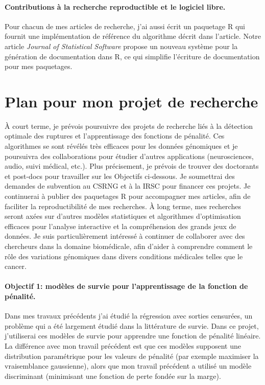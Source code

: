 \documentclass{article}
\begin{document}
\paragraph{Contributions à la recherche reproductible et le logiciel
  libre.} Pour chacun de mes articles de recherche, j'ai aussi écrit
un paquetage R qui fournit une implémentation de référence du
algorithme décrit dans l'article. Notre article \emph{Journal of
  Statistical Software} \citep{hocking13:inlinedocs} propose un
nouveau système pour la génération de documentation dans R, ce qui
simplifie l'écriture de documentation pour mes paquetages.

\section{Plan pour mon projet de recherche}

À court terme, je prévois poursuivre des projets de recherche liés à
la détection optimale des ruptures et l'apprentissage des fonctions de
pénalité. Ces algorithmes se sont révélés très efficaces pour les
données génomiques et je poursuivra des collaborations pour étudier
d'autres applications (neurosciences, audio, suivi médical,
etc.). Plus précisement, je prévois de trouver des doctorants et
post-docs pour travailler sur les Objectifs ci-dessous. Je soumettrai
des demandes de subvention au CSRNG et à la IRSC pour financer ces
projets. Je continuerai à publier des paquetages R pour accompagner
mes articles, afin de faciliter la reproductibilité de mes
recherches. À long terme, mes recherches seront axées sur d'autres
modèles statistiques et algorithmes d'optimisation efficaces pour
l'analyse interactive et la compréhension des grands jeux de
données. Je suis particulièrement intéressé à continuer de collaborer
avec des chercheurs dans la domaine biomédicale, afin d'aider à
comprendre comment le rôle des variations génomiques dans divers
conditions médicales telles que le cancer.

\paragraph{Objectif 1: modèles de survie pour l'apprentissage de la
  fonction de pénalité.} Dans mes travaux précédents j'ai étudié la
régression avec sorties censurées, un problème qui a été largement
étudié dans la littérature de survie. Dans ce projet, j'utiliserai ces
modèles de survie pour apprendre une fonction de pénalité linéaire. La
différence avec mon travail précédent est que ces modèles supposent
une distribution paramétrique pour les valeurs de pénalité (par
exemple maximiser la vraisemblance gaussienne), alors que mon travail
précédent a utilisé un modèle discriminant (minimisant une fonction de
perte fondée sur la marge).
\end{document}
